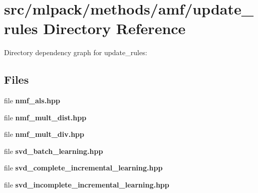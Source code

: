 \section{src/mlpack/methods/amf/update\-\_\-rules Directory Reference}
\label{dir_8cda8e548c5e8c927f86d87d16c2389b}
Directory dependency graph for update\-\_\-rules\-:
\subsection*{Files}
\begin{DoxyCompactItemize}
\item 
file {\bf nmf\-\_\-als.\-hpp}
\item 
file {\bf nmf\-\_\-mult\-\_\-dist.\-hpp}
\item 
file {\bf nmf\-\_\-mult\-\_\-div.\-hpp}
\item 
file {\bf svd\-\_\-batch\-\_\-learning.\-hpp}
\item 
file {\bf svd\-\_\-complete\-\_\-incremental\-\_\-learning.\-hpp}
\item 
file {\bf svd\-\_\-incomplete\-\_\-incremental\-\_\-learning.\-hpp}
\end{DoxyCompactItemize}

